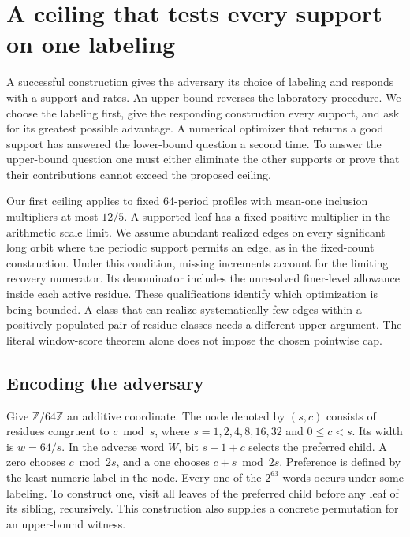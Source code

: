 \section{A ceiling that tests every support on one labeling}
\label{sec:closed-box-oracle}

A successful construction gives the adversary its choice of labeling and responds with a support and rates. An upper bound reverses the laboratory procedure. We choose the labeling first, give the responding construction every support, and ask for its greatest possible advantage. A numerical optimizer that returns a good support has answered the lower-bound question a second time. To answer the upper-bound question one must either eliminate the other supports or prove that their contributions cannot exceed the proposed ceiling.

Our first ceiling applies to fixed 64-period profiles with mean-one inclusion multipliers at most \(12/5\). A supported leaf has a fixed positive multiplier in the arithmetic scale limit. We assume abundant realized edges on every significant long orbit where the periodic support permits an edge, as in the fixed-count construction. Under this condition, missing increments account for the limiting recovery numerator. Its denominator includes the unresolved finer-level allowance inside each active residue. These qualifications identify which optimization is being bounded. A class that can realize systematically few edges within a positively populated pair of residue classes needs a different upper argument. The literal window-score theorem alone does not impose the chosen pointwise cap.

\subsection{Encoding the adversary}

Give \(\mathbb Z/64\mathbb Z\) an additive coordinate. The node denoted by \((s,c)\) consists of residues congruent to \(c\bmod s\), where \(s=1,2,4,8,16,32\) and \(0\le c<s\). Its width is \(w=64/s\). In the adverse word \(W\), bit \(s-1+c\) selects the preferred child. A zero chooses \(c\bmod 2s\), and a one chooses \(c+s\bmod 2s\). Preference is defined by the least numeric label in the node. Every one of the \(2^{63}\) words occurs under some labeling. To construct one, visit all leaves of the preferred child before any leaf of its sibling, recursively. This construction also supplies a concrete permutation for an upper-bound witness.

